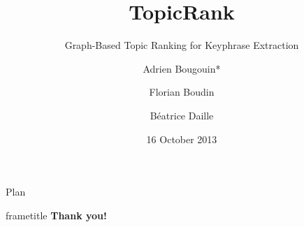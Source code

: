 \documentclass[14pt, xcolor={usenames, dvipsnames}]{beamer}
\title{TopicRank}
\subtitle{Graph-Based Topic Ranking for Keyphrase Extraction}
\author{Adrien Bougouin* \and Florian Boudin \and Béatrice Daille}
\institute{\normalsize{Université de Nantes, LINA, France}}
\date{16 October 2013}
\begin{document}
  \renewcommand*{\theenumii}{\alph{enumii}}
  \renewcommand*{\theenumiii}{\roman{enumiii}}

  \begin{frame}
    \titlepage
  \end{frame}
  \setcounter{framenumber}{0}

  
  
  
  \begin{frame}{Plan}
    \tableofcontents
  \end{frame}
  
  
  
  \begin{frame}
    \vfill
    \begin{beamercolorbox}[center,shadow=true,rounded=true]{frametitle} 
      \Huge{\textbf{Thank you!}}
    \end{beamercolorbox} 
    \vfill
  \end{frame}
  
%      
%      
\end{document}
